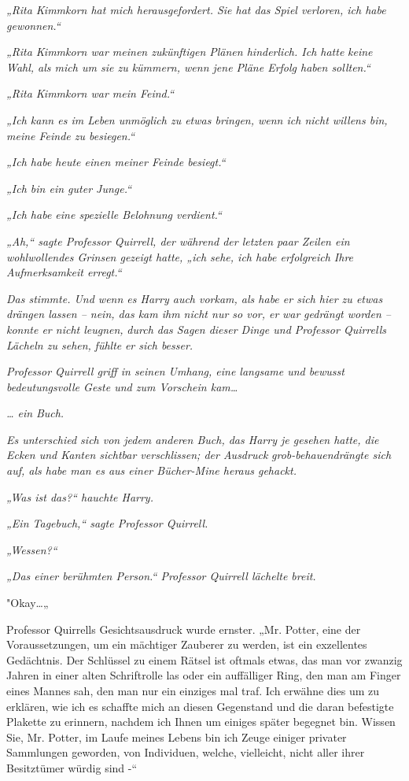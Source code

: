 {\emph{„Rita Kimmkorn hat mich herausgefordert. Sie hat das Spiel verloren, ich habe gewonnen.“}

\emph{„Rita Kimmkorn war meinen zukünftigen Plänen hinderlich. Ich hatte} \emph{keine Wahl, als mich um sie zu kümmern, wenn jene Pläne Erfolg haben sollten.“}

\emph{„Rita Kimmkorn war mein Feind.“}

\emph{„Ich kann es im Leben unmöglich zu etwas bringen, wenn ich nicht willens bin, meine Feinde zu besiegen.“}

\emph{„Ich habe heute einen meiner Feinde besiegt.“}

\emph{„Ich bin ein guter Junge.“}

\emph{„Ich habe eine spezielle Belohnung verdient.“}

\emph{„Ah,“ sagte Professor Quirrell, der während der letzten paar Zeilen ein wohlwollendes Grinsen gezeigt hatte, „ich sehe, ich habe erfolgreich Ihre Aufmerksamkeit erregt.“}

\emph{Das stimmte. Und wenn es Harry auch vorkam, als habe er sich hier zu etwas drängen lassen -- nein, das kam ihm nicht nur so vor, er} \emph{\emph{war}} \emph{gedrängt worden -- konnte er nicht leugnen,} \emph{durch das Sagen dieser Dinge und Professor Quirrells Lächeln zu sehen,} \emph{\emph{fühlte}} \emph{er sich besser.}

\emph{Professor Quirrell griff in seinen Umhang, eine langsame und bewusst bedeutungsvolle Geste und zum Vorschein kam…}

\emph{… ein} \emph{\emph{Buch.}}

\emph{Es unterschied sich von jedem anderen Buch, das Harry je gesehen hatte, die Ecken und Kanten sichtbar verschlissen; der Ausdruck} \emph{\emph{grob-behauen}drängte sich auf, als habe man es aus einer Bücher-Mine heraus gehackt.}

\emph{„Was ist das?“ hauchte Harry.}

\emph{„Ein Tagebuch,“ sagte Professor Quirrell.}

\emph{„Wessen?“}

\emph{„Das einer berühmten Person.“ Professor Quirrell lächelte breit.}

"Okay…„

Professor Quirrells Gesichtsausdruck wurde ernster. „Mr. Potter, eine der Voraussetzungen, um ein mächtiger Zauberer zu werden, ist ein exzellentes Gedächtnis. Der Schlüssel zu einem Rätsel ist oftmals etwas, das man vor zwanzig Jahren in einer alten Schriftrolle las oder ein auffälliger Ring, den man am Finger eines Mannes sah, den man nur ein einziges mal traf. Ich erwähne dies um zu erklären, wie ich es schaffte mich an diesen Gegenstand und die daran befestigte Plakette zu erinnern, nachdem ich Ihnen um einiges später begegnet bin. Wissen Sie, Mr. Potter, im Laufe meines Lebens bin ich Zeuge einiger privater Sammlungen geworden, von Individuen, welche, vielleicht, nicht aller ihrer Besitztümer würdig sind -“

}
